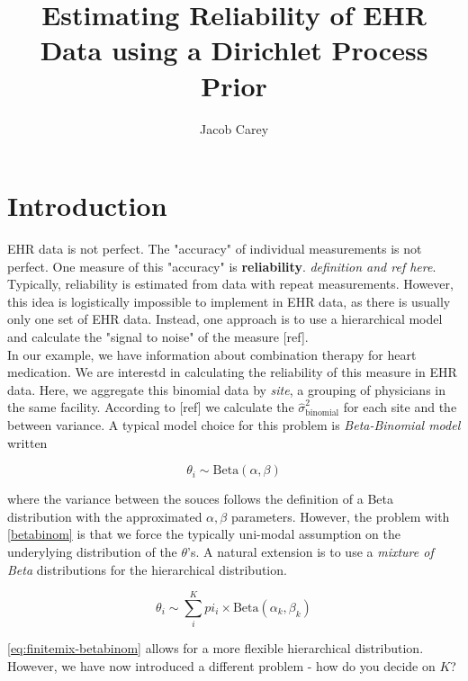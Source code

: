 \documentclass{article}
\begin{document}
\title{Estimating Reliability of EHR Data using a Dirichlet Process Prior}
\author{Jacob Carey}

\maketitle

\section{Introduction}

EHR data is not perfect. The "accuracy" of individual measurements is not perfect. One measure of this "accuracy" is \textbf{reliability}. \textit{definition and ref here}. Typically, reliability is estimated from data with repeat measurements. However, this idea is logistically impossible to implement in EHR data, as there is usually only one set of EHR data. Instead, one approach is to use a hierarchical model and calculate the "signal to noise" of the measure [ref]. \\

In our example, we have information about combination therapy for heart medication. We are interestd in calculating the reliability of this measure in EHR data. Here, we aggregate this binomial data by \textit{site}, a grouping of physicians in the same facility. According to [ref] we calculate the $\hat{\sigma}^2_{\text{binomial}}$ for each site and the between variance. A typical model choice for this problem is \textit{Beta-Binomial model} written

\begin{equation}\label{betabinom}
\theta_i \sim \text{Beta}(\alpha, \beta)
\end{equation}

where the variance between the souces follows the definition of a Beta distribution with the approximated $\alpha, \beta$ parameters. However, the problem with \eqref{betabinom} is that we force the typically uni-modal assumption on the underylying distribution of the $\theta$'s. A natural extension is to use a \textit{mixture of Beta} distributions for the hierarchical distribution.

\begin{equation}\label{eq:finitemix-betabinom}
\theta_i \sim \sum_i^K pi_i \times \text{Beta}(\alpha_k, \beta_k)
\end{equation}

\eqref{eq:finitemix-betabinom} allows for a more flexible hierarchical distribution. However, we have now introduced a different problem - how do you decide on $K$?
\end{document}
